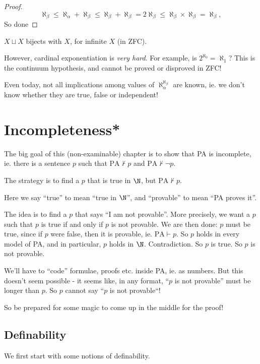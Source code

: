 \documentclass[a4paper]{article}
\begin{document}
\begin{proof}
  \[
    \aleph_\beta \leq \aleph_\alpha + \aleph_\beta \leq \aleph_\beta + \aleph_\beta = 2\aleph_\beta \leq \aleph_\beta\times \aleph_\beta = \aleph_\beta,
  \]
  So done
\end{proof}

\begin{eg}
  $X\sqcup X$ bijects with $X$, for infinite $X$ (in ZFC).
\end{eg}

However, cardinal exponentiation is \emph{very hard}. For example, is $2^{\aleph_0} = \aleph_1$? This is the continuum hypothesis, and cannot be proved or disproved in ZFC!

Even today, not all implications among values of $\aleph_\alpha^{\aleph_\beta}$ are known, ie. we don't know whether they are true, false or independent!
\section{Incompleteness*}
The big goal of this (non-examinable) chapter is to show that PA is incomplete, ie. there is a sentence $p$ such that $\mathrm{PA}\not\vdash p$ and $\mathrm{PA}\not\vdash \neg p$.

The strategy is to find a $p$ that is true in $\N$, but $\mathrm{PA}\not\vdash p$.

Here we say ``true'' to mean ``true in $\N$'', and ``provable'' to mean ``PA proves it''.

The idea is to find a $p$ that says ``I am not provable''. More precisely, we want a $p$ such that $p$ is true if and only if $p$ is not provable. We are then done: $p$ must be true, since if $p$ were false, then it is provable, ie. $\mathrm{PA}\vdash p$. So $p$ holds in every model of PA, and in particular, $p$ holds in $\N$. Contradiction. So $p$ is true. So $p$ is not provable.

We'll have to ``code'' formulae, proofs etc. inside PA, ie. as numbers. But this doesn't seem possible - it seems like, in any format, ``$p$ is not provable'' must be longer than $p$. So $p$ cannot say ``$p$ is not provable``!

So be prepared for some magic to come up in the middle for the proof!

\subsection*{Definability}
We first start with some notions of definability.
\end{document}
